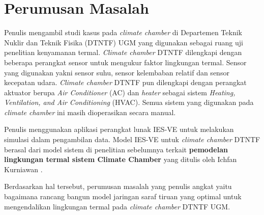 
\section{Perumusan Masalah}
Penulis mengambil studi kasus pada \textit{climate chamber} di Departemen Teknik Nuklir dan Teknik Fisika (DTNTF) UGM yang digunakan sebagai ruang uji penelitian kenyamanan termal. \textit{Climate chamber} DTNTF dilengkapi dengan beberapa perangkat sensor untuk mengukur faktor lingkungan termal. Sensor yang digunakan yakni sensor suhu, sensor kelembaban relatif dan sensor kecepatan udara. \textit{Climate chamber} DTNTF pun dilengkapi dengan perangkat aktuator berupa \textit{Air Conditioner} (AC) dan \textit{heater} sebagai sistem \textit{Heating, Ventilation, and Air Conditioning} (HVAC). Semua sistem yang digunakan pada \textit{climate chamber} ini masih dioperasikan secara manual.

Penulis menggunakan aplikasi perangkat lunak IES-VE untuk melakukan simulasi dalam pengambilan data. Model IES-VE untuk \textit{climate chamber} DTNTF berasal dari model sistem di penelitian sebelumnya terkait \textbf{pemodelan lingkungan termal sistem Climate Chamber} yang ditulis oleh Ichfan Kurniawan \cite{skripsiIchfan}.

Berdasarkan hal tersebut, perumusan masalah yang penulis angkat yaitu bagaimana rancang bangun model jaringan saraf tiruan yang optimal untuk mengendalikan lingkungan termal pada \textit{climate chamber} DTNTF UGM.

